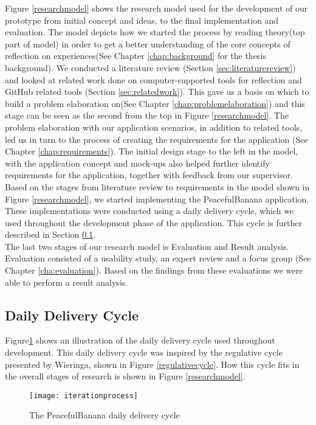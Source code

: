 Figure \ref{researchmodel} shows the research model used for the development of our prototype from initial concept and ideas, to the final implementation and evaluation. The model depicts how we started the process by reading theory(top part of model) in order to get a better understanding of the core concepts of reflection on experiences(See Chapter \ref{chap:background} for the thesis background).
\clearpage 
We conducted a literature review (Section \ref{sec:literaturereview}) and looked at related work done on computer-supported tools for reflection and GitHub related tools (Section \ref{sec:relatedwork}). This gave us a basis on which to build a problem elaboration on(See Chapter \ref{chap:problemelaboration}) and this stage can be seen as the second from the top in Figure \ref{researchmodel}. The problem elaboration with our application scenarios, in addition to related tools, led us in turn to the process of creating the requirements for the application (See Chapter \ref{chap:requirements}). The initial design stage to the left in the model, with the application concept and mock-ups also helped further identify requirements for the application, together with feedback from our supervisor. \\
Based on the stages from literature review to requirements in the model shown in Figure \ref{researchmodel}, we started implementing the PeacefulBanana application. These implementations were conducted using a daily delivery cycle, which we used throughout the development phase of the application. This cycle is further described in Section \ref{sec:dailydeliverycycle}. \\
The last two stages of our research model is Evaluation and Result analysis. Evaluation consisted of a usability study, an expert review and a focus group (See Chapter \ref{cha:evaluation}). Based on the findings from these evaluations we were able to perform a result analysis. 

\subsection{Daily Delivery Cycle}
\label{sec:dailydeliverycycle}
Figure\ref{iterationprocess} shows an illustration of the daily delivery cycle used throughout development. This daily delivery cycle was inspired by the regulative cycle presented by Wieringa\citep{wieringa}, shown in Figure \ref{regulativecycle}. How this cycle fits in the overall stages of research is shown in Figure \ref{researchmodel}.
\begin{figure}[!htpb]
\centering
	\texttt{[image: iterationprocess]}
\caption{The PeacefulBanana daily delivery cycle}
\label{iterationprocess}
\end{figure}

